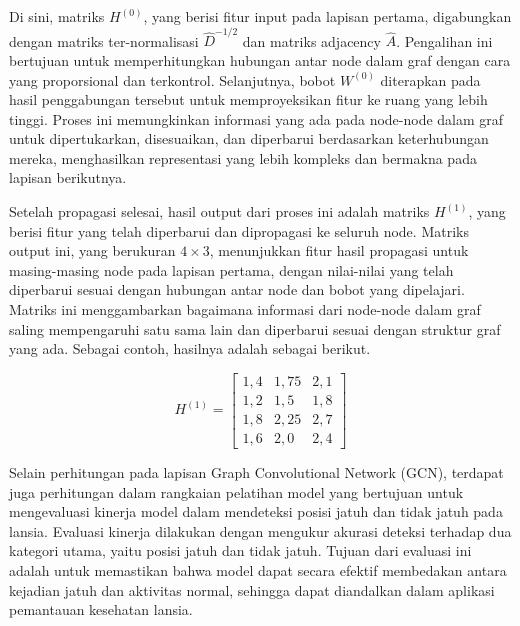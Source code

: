 Di sini, matriks $H^{(0)}$, yang berisi fitur input pada lapisan pertama, digabungkan dengan matriks ter-normalisasi $\hat{D}^{-1/2}$ dan matriks adjacency $\hat{A}$. Pengalihan ini bertujuan untuk memperhitungkan hubungan antar node dalam graf dengan cara yang proporsional dan terkontrol. Selanjutnya, bobot $W^{(0)}$ diterapkan pada hasil penggabungan tersebut untuk memproyeksikan fitur ke ruang yang lebih tinggi. Proses ini memungkinkan informasi yang ada pada node-node dalam graf untuk dipertukarkan, disesuaikan, dan diperbarui berdasarkan keterhubungan mereka, menghasilkan representasi yang lebih kompleks dan bermakna pada lapisan berikutnya.

Setelah propagasi selesai, hasil output dari proses ini adalah matriks $H^{(1)}$, yang berisi fitur yang telah diperbarui dan dipropagasi ke seluruh node. Matriks output ini, yang berukuran $4 \times 3$, menunjukkan fitur hasil propagasi untuk masing-masing node pada lapisan pertama, dengan nilai-nilai yang telah diperbarui sesuai dengan hubungan antar node dan bobot yang dipelajari. Matriks ini menggambarkan bagaimana informasi dari node-node dalam graf saling mempengaruhi satu sama lain dan diperbarui sesuai dengan struktur graf yang ada. Sebagai contoh, hasilnya adalah sebagai berikut.\par
\vspace{0.3cm}
$$
H^{(1)} = 
\begin{bmatrix}
1,4 & 1,75 & 2,1 \\
1,2 & 1,5 & 1,8 \\
1,8 & 2,25 & 2,7 \\
1,6 & 2,0 & 2,4
\end{bmatrix}
$$
\vspace{0.5cm}\par

Selain perhitungan pada lapisan Graph Convolutional Network (GCN), terdapat juga perhitungan dalam rangkaian pelatihan model yang bertujuan untuk mengevaluasi kinerja model dalam mendeteksi posisi jatuh dan tidak jatuh pada lansia. Evaluasi kinerja dilakukan dengan mengukur akurasi deteksi terhadap dua kategori utama, yaitu posisi jatuh dan tidak jatuh. Tujuan dari evaluasi ini adalah untuk memastikan bahwa model dapat secara efektif membedakan antara kejadian jatuh dan aktivitas normal, sehingga dapat diandalkan dalam aplikasi pemantauan kesehatan lansia.\par

